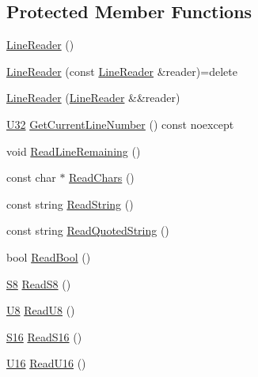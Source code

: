 \subsection*{Protected Member Functions}
\begin{DoxyCompactItemize}
\item 
\hyperlink{classmage_1_1_line_reader_ab4a46321d7ea3ecda2d6390c78a7285b}{Line\+Reader} ()
\item 
\hyperlink{classmage_1_1_line_reader_ae4f871bebae110704b34c0bd88460639}{Line\+Reader} (const \hyperlink{classmage_1_1_line_reader}{Line\+Reader} \&reader)=delete
\item 
\hyperlink{classmage_1_1_line_reader_ad972c7100f726e7b061d864083ba0225}{Line\+Reader} (\hyperlink{classmage_1_1_line_reader}{Line\+Reader} \&\&reader)
\item 
\hyperlink{namespacemage_a41c104c036fba3756a74e19f793eeaa1}{U32} \hyperlink{classmage_1_1_line_reader_aa0ed768e2799b74f2341c56fc6ac4969}{Get\+Current\+Line\+Number} () const noexcept
\item 
void \hyperlink{classmage_1_1_line_reader_a3a4b99bfef1e8a826d74a01bcc663fcb}{Read\+Line\+Remaining} ()
\item 
const char $\ast$ \hyperlink{classmage_1_1_line_reader_ad915c1a17549c7758c10f0b6db7e5611}{Read\+Chars} ()
\item 
const string \hyperlink{classmage_1_1_line_reader_a58a27b637574ce56ea17a575aa540675}{Read\+String} ()
\item 
const string \hyperlink{classmage_1_1_line_reader_ae9a7547d01b29c3237b198444d4f3aef}{Read\+Quoted\+String} ()
\item 
bool \hyperlink{classmage_1_1_line_reader_a86289c358afe9b3bc5c7789bb8a6af95}{Read\+Bool} ()
\item 
\hyperlink{namespacemage_a20766a773cfd6c14d8f2344d4631b89c}{S8} \hyperlink{classmage_1_1_line_reader_a39a5e24bb2b416c56a98cabd93efcc73}{Read\+S8} ()
\item 
\hyperlink{namespacemage_afc638980bc6154f15af5e2d93a0e0ea9}{U8} \hyperlink{classmage_1_1_line_reader_a5fcc116b81d0357acdb9641e8f293e31}{Read\+U8} ()
\item 
\hyperlink{namespacemage_add9d3fe59b2a338108e98fcd67507005}{S16} \hyperlink{classmage_1_1_line_reader_a9f3ca4ad3606d9b67a90698c2b71bdd0}{Read\+S16} ()
\item 
\hyperlink{namespacemage_af69057eec1ce005c1c3b34ae33486f16}{U16} \hyperlink{classmage_1_1_line_reader_ac182214e611518cb8b8c1f8cd6b08f0c}{Read\+U16} ()
\item 

\end{DoxyCompactItemize}
